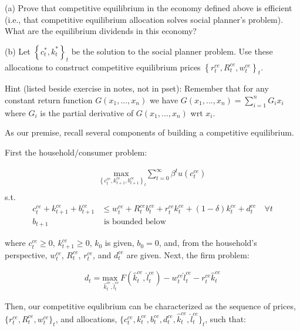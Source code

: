 (a) Prove that competitive equilibrium in the economy defined above is efficient (i.e., that competitive equilibrium allocation solves social planner's problem). What are the equilibrium dividends in this economy?

(b) Let $\left\{c_t^*, k_t^*\right\}_t$ be the solution to the social planner problem. Use these allocations to construct competitive equilibrium prices $\left\{r_t^{c e}, R_t^{c e}, w_t^{c e}\right\}_t$.

Hint (listed beside exercise in notes, not in pset):
Remember that for any constant return function $G(x_1, ..., x_n)$
we have $G(x_1, ..., x_n) = \sum_{i=1}^n G_ix_i$
where $G_i$ is the partial derivative of $G(x_1, ..., x_n)$ wrt $x_i$.


As our premise, recall several components of building a competitive equilibrium.

First the household/consumer problem:

\begin{align}
    \underset{\left\{c_t^{ce}, k_{t+1}^{ce}, b_{t+1}^{ce}\right\}_t}{\text{max }} \sum_{t=0}^\infty \beta^t u(c_t^{ce}) \\
\end{align}
s.t.
\begin{align}
    c_t^{ce} + k_{t+1}^{ce} + b_{t+1}^{ce} &\leq w_t^{ce} + R_t^{ce}b_t^{ce} + r_t^{ce}k_t^{ce} + (1 - \delta)k_t^{ce} + d_t^{ce} \quad \forall t \label{eq:pset_2023_24_ps1_q3_golosov_hh_budget_constraint} \\
    b_{t+1} &\text{ is bounded below}
\end{align}

where $c_t^{ce} \geq 0$, $k_{t+1}^{ce} \geq 0$, $k_0$ is given, $b_0 = 0$,
and, from the household's perspective, $w_t^{ce}$, $R_t^{ce}$, $r_t^{ce}$, and $d_t^{ce}$ are given.
Next, the firm problem:

\begin{align}
    d_t = \underset{\hat{k}_t^{ce}, \hat{l}_t^{ce}}{\text{max }} F(\hat{k}_t^{ce}, \hat{l}_t^{ce}) - w_t^{ce}\hat{l}_t^{ce} - r_t^{ce}\hat{k}_t^{ce} \label{eq:pset_2023_24_ps1_q3_golosov_firm_problem}
\end{align}

Then, our competitive equlibrium can be characterized as the 
sequence of prices, $\{r_t^{ce}, R_t^{ce}, w_t^{ce}\}_t$,
and allocations, $\{c_t^{ce}, k_{t}^{ce}, b_{t}^{ce}, d_t^{ce}, \hat{k}_t^{ce}, \hat{l}_t^{ce}\}_t$,
such that:

